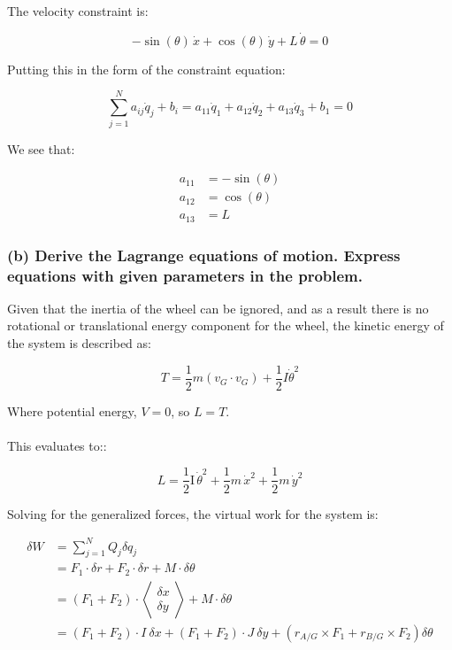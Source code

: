 \documentclass[12pt, letterpaper]{../assignment}
\begin{document}
The velocity constraint is:

\begin{answer}
$$-\sin \left(\theta \right)\,\dot{x} +\cos \left(\theta \right)\,\dot{y}+ L\,\dot{\theta}=0$$
\end{answer}

Putting this in the form of the constraint equation:

$$ \sum_{j=1}^N a_{ij} \dot{q}_j + b_i =
a_{11} \dot{q}_1 + a_{12} \dot{q}_2 + a_{13} \dot{q}_3 + b_1 = 0  $$

We see that:

\begin{answer}
\begin{equation*}
    \begin{aligned}
        a_{11} &= -\sin \left(\theta \right) \\
        a_{12} &= \cos \left(\theta \right) \\
        a_{13} &= L
    \end{aligned}
\end{equation*}
\end{answer}

\subsubsection*{(b) Derive the Lagrange equations of motion.
Express equations with given parameters in the problem.}

Given that the inertia of the wheel can be ignored,
and as a result there is no rotational or translational energy component for the wheel,
the kinetic energy of the system is described as:

$$ T = \frac{1}{2} m \left(v_G \cdot v_G \right) +
       \frac{1}{2} I \dot{\theta}^2 $$

Where potential energy, $V = 0$, so $L = T$.
\\\\
This evaluates to::

$$ L = \frac{1}{2}\textrm{I}\,{{\dot{\theta} }}^2 +\frac{1}{2}m\,{{\dot{x}}}^2 +\frac{1}{2}m\,{{\dot{y}}}^2 $$

Solving for the generalized forces, the virtual work for the system is:

\begin{equation*}
  \begin{aligned}
    \delta W &= \sum_{j=1}^N Q_j \delta q_j \\
             &= F_1 \cdot \delta r + F_2 \cdot \delta r + M \cdot \delta \theta \\
             &= \left( F_1 + F_2 \right) \cdot \left< \begin{array}{ccc} \delta x \\ \delta y \end{array} \right> + M \cdot \delta \theta \\
             &= \left( F_1 + F_2 \right) \cdot I\ \delta x + \left( F_1 + F_2 \right) \cdot J\ \delta y + \left(r_{A/G} \times F_1 + r_{B/G} \times F_2\right) \delta \theta
  \end{aligned}
\end{equation*}
\end{document}
